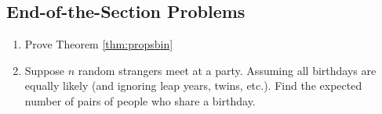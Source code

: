 \subsection{End-of-the-Section Problems}
\begin{enumerate}
    \item Prove Theorem \ref{thm:propsbin}
    \item Suppose $n$ random strangers meet at a party. Assuming all birthdays are equally likely (and ignoring leap years, twins, etc.). Find the expected number of pairs of people who share a birthday. 
\end{enumerate}
